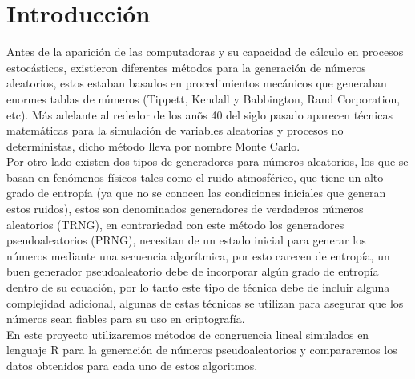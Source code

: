 \documentclass[conference,a4paper]{IEEEtran}
\begin{document}
\section{\textbf{Introducci\'on}}
Antes de la aparici\'on de las computadoras y su capacidad de c\'alculo en procesos estoc\'asticos, existieron diferentes m\'etodos para la generaci\'on de n\'umeros aleatorios, estos estaban basados en procedimientos mec\'anicos que generaban enormes tablas de n\'umeros (Tippett, Kendall y Babbington, Rand Corporation, etc). M\'as adelante al rededor de los an\~os 40 del siglo pasado aparecen t\'ecnicas matem\'aticas para la simulaci\'on de variables aleatorias y procesos no deterministas, dicho m\'etodo lleva por nombre Monte Carlo.\\
Por otro lado existen dos tipos de generadores para n\'umeros aleatorios, los que se basan en fen\'omenos f\'isicos tales como el ruido atmosf\'erico, que tiene un alto grado de entrop\'ia (ya que no se conocen las condiciones iniciales que generan estos ruidos), estos son denominados generadores de verdaderos n\'umeros aleatorios (TRNG), en contrariedad con este m\'etodo los generadores pseudoaleatorios (PRNG), necesitan de un estado inicial para generar los n\'umeros mediante una secuencia algor\'itmica, por esto carecen de entrop\'ia, un buen generador pseudoaleatorio debe de incorporar alg\'un grado de entrop\'ia dentro de su ecuaci\'on, por lo tanto este tipo de t\'ecnica debe de incluir alguna complejidad adicional, algunas de estas t\'ecnicas se utilizan para asegurar que los n\'umeros sean fiables para su uso en criptograf\'ia.\\
En este proyecto utilizaremos m\'etodos de congruencia lineal simulados en lenguaje R para la generaci\'on de n\'umeros pseudoaleatorios y compararemos los datos obtenidos para cada uno de estos algoritmos.
\end{document}
